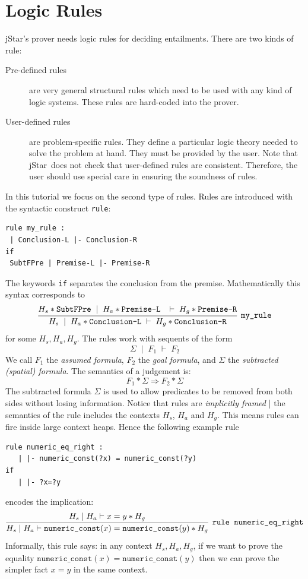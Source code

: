 \documentclass[11pt]{article}
\newcommand{\jStar}{{\sf jStar}}
\begin{document}
\section{Logic Rules}
\label{sec:logic-rules}
\jStar's  prover needs logic rules for deciding entailments. There are
two kinds of rule:
%
\begin{description}
\item[Pre-defined rules] are very general structural rules which need
  to be used with any kind of logic systems. These
  rules are hard-coded into the prover.
\item[User-defined rules] are problem-specific rules. They define a
  particular logic theory needed to solve the problem at hand. They
  must be provided by the user. Note that \jStar \ does not check that user-defined rules are 
  consistent. Therefore, the user should use special care in ensuring the soundness of rules.
\end{description} 
In this tutorial we focus on the second type of rules. Rules are introduced with
the syntactic construct {\tt rule}:
\begin{verbatim}
rule my_rule :
 | Conclusion-L |- Conclusion-R 
if 
 SubtFPre | Premise-L |- Premise-R
  \end{verbatim}
The keywords {\tt if} separates the conclusion from the premise.
Mathematically this syntax corresponds to
\[
\infer[\texttt{my\_rule}]
{ H_s \; \mid \; H_a *  \texttt{Conclusion-L}  \; \vdash \; H_g * \texttt{Conclusion-R} }
{ H_s * \texttt{SubtFPre} \; \mid \; H_a * \texttt{Premise-L } \; \vdash \; H_g * \texttt{Premise-R} 
} 
\] for some $H_s, H_a, H_g$. The rules work with sequents of the form
\[
\Sigma \; \mid \; F_1 \; \vdash \; F_2 
\]
We call $F_1$ the \emph{assumed formula}, $F_2$ the \emph{goal formula}, and $\Sigma$ the \emph{subtracted (spatial) formula}.  The semantics of a judgement is:
\[
F_1 *  \Sigma \Longrightarrow F_2 * \Sigma
\]
The subtracted formula $\Sigma$ is used to allow predicates to be
removed from both sides without losing information. 
Notice that rules are \emph{implicitly framed} | the semantics of the rule includes the contexts $H_s$, $H_a$ and $H_g$. This means rules can fire inside large context heaps. 
Hence the 
following example rule 
\begin{verbatim}
rule numeric_eq_right :
   | |- numeric_const(?x) = numeric_const(?y) 
if
   | |- ?x=?y
\end{verbatim}
encodes the implication:
\[
\infer[\texttt{rule numeric\_eq\_right}]{ H_s  \mid H_a \vdash \texttt{numeric\_const}(x) = \texttt{numeric\_const}(y) * H_g}{ H_s  \mid H_a \vdash x=y * H_g}
\]
Informally, this rule says: in any context $H_s, H_a, H_g$, if we want to prove the equality $\texttt{numeric\_const}(x) = \texttt{numeric\_const}(y)$ then we can prove the simpler fact $x=y$ in the same context.
\end{document}
